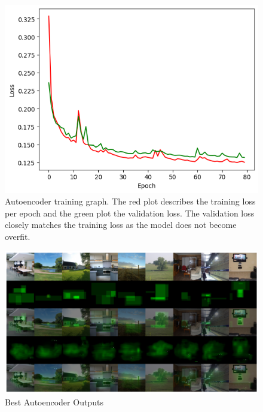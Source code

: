 \documentclass{UoYCSproject}
\begin{document}
\begin{figure}[h]
    \centering
    \includegraphics[width=\linewidth]{Autoencoder Training Curve}
    \caption{Autoencoder training graph. The red plot describes the training loss per epoch and the green plot the validation loss. The validation loss closely matches the training loss as the model does not become overfit.}
    \label{fig:autoencoderTraining}
\end{figure}

\begin{figure}[h]
    \centering
    \includegraphics[width=\linewidth]{Best autoencoder Outputs}
    \caption{Best Autoencoder Outputs}
    \label{fig:autoencoderBestOutput}
\end{figure}
\end{document}
